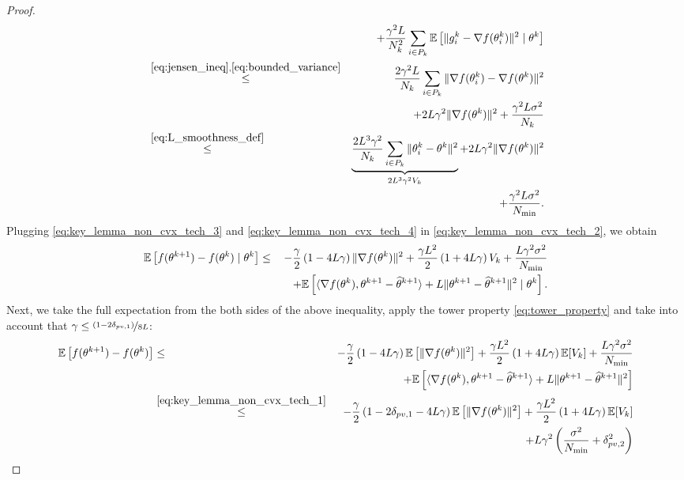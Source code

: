 \begin{proof}
\begin{eqnarray}
    &&\quad + \frac{\gamma^2L}{N_k^2}\sum\limits_{i\in P_k}\mathbb{E}\left[\|g_i^k - \nabla f(\theta_i^k)\|^2\mid \theta^k\right]\notag\\
    &\overset{\eqref{eq:jensen_ineq},\eqref{eq:bounded_variance}}{\le}& \frac{2\gamma^2L}{N_k}\sum\limits_{i\in P_k}\|\nabla f(\theta_i^k)-\nabla f(\theta^k)\|^2\notag\\
    &&\quad + 2L\gamma^2\|\nabla f(\theta^k)\|^2 + \frac{\gamma^2L\sigma^2}{N_k}\notag\\
    &\overset{\eqref{eq:L_smoothness_def}}{\le}& \underbrace{\frac{2L^3\gamma^2}{N_k}\sum\limits_{i\in P_k}\|\theta_i^k - \theta^k\|^2}_{2L^3\gamma^2 V_k} + 2L\gamma^2\|\nabla f(\theta^k)\|^2\notag\\
    &&\quad + \frac{\gamma^2L\sigma^2}{N_{\min}}. \label{eq:key_lemma_non_cvx_tech_4}
\end{eqnarray}
Plugging \eqref{eq:key_lemma_non_cvx_tech_3} and \eqref{eq:key_lemma_non_cvx_tech_4} in \eqref{eq:key_lemma_non_cvx_tech_2}, we obtain
\begin{eqnarray}
    \mathbb{E}\left[f(\theta^{k+1}) - f(\theta^k)\mid \theta^k\right] &\le& -\frac{\gamma}{2}\left(1 - 4L\gamma\right)\|\nabla f(\theta^k)\|^2 + \frac{\gamma L^2}{2}\left(1 + 4L\gamma\right)V_k + \frac{L\gamma^2\sigma^2}{N_{\min}}\notag\\
    &&\quad + \mathbb{E}\left[\langle\nabla f(\theta^k), \theta^{k+1} - \widehat{\theta}^{k+1} \rangle + L\|\theta^{k+1} - \widehat{\theta}^{k+1}\|^2\mid \theta^k\right].\notag
\end{eqnarray}
Next, we take the full expectation from the both sides of the above inequality, apply the tower property \eqref{eq:tower_property} and take into account that $\gamma \le \nicefrac{(1-2\delta_{pv,1})}{8L}$:
\begin{eqnarray*}
    \EE\left[f(\theta^{k+1}) - f(\theta^k)\right] &\le& -\frac{\gamma}{2}\left(1 - 4L\gamma\right)\EE\left[\|\nabla f(\theta^k)\|^2\right] + \frac{\gamma L^2}{2}\left(1 + 4L\gamma\right)\EE[V_k] + \frac{L\gamma^2\sigma^2}{N_{\min}}\\
    &&\quad + \EE\left[\langle\nabla f(\theta^k), \theta^{k+1} - \widehat{\theta}^{k+1} \rangle + L\|\theta^{k+1} - \widehat{\theta}^{k+1}\|^2\right]\\
    &\overset{\eqref{eq:key_lemma_non_cvx_tech_1}}{\le}& -\frac{\gamma}{2}\left(1 - 2\delta_{pv,1} - 4L\gamma\right)\EE\left[\|\nabla f(\theta^k)\|^2\right] + \frac{\gamma L^2}{2}\left(1 + 4L\gamma\right)\EE[V_k] \notag\\
    &&\quad + L\gamma^2\left(\frac{\sigma^2}{N_{\min}} + \delta_{pv,2}^2\right)\\

\end{eqnarray*}
\end{proof}

